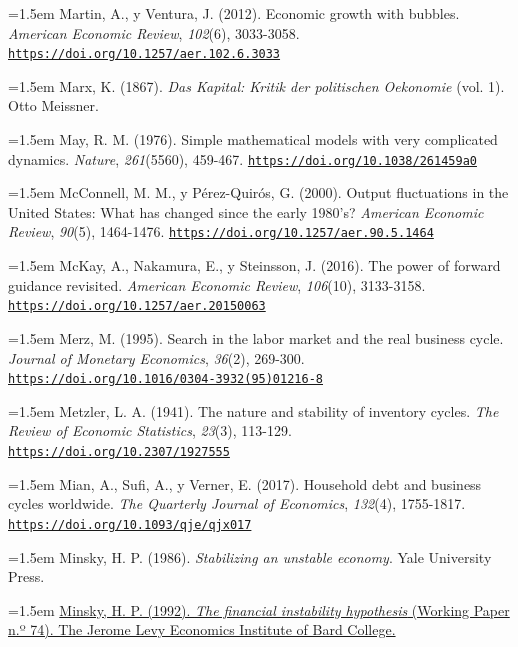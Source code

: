 \documentclass[10pt,a4paper]{article}
\begin{document}
\noindent\hangindent=1.5em Martin, A., y Ventura, J. (2012). Economic growth with bubbles. \textit{American Economic Review}, \textit{102}(6), 3033-3058. \href{https://doi.org/10.1257/aer.102.6.3033}{\nolinkurl{https://doi.org/10.1257/aer.102.6.3033}}

\noindent\hangindent=1.5em Marx, K. (1867). \textit{Das Kapital: Kritik der politischen Oekonomie} (vol. 1). Otto Meissner.

\noindent\hangindent=1.5em May, R. M. (1976). Simple mathematical models with very complicated dynamics. \textit{Nature}, \textit{261}(5560), 459-467. \href{https://doi.org/10.1038/261459a0}{\nolinkurl{https://doi.org/10.1038/261459a0}}

\noindent\hangindent=1.5em McConnell, M. M., y Pérez-Quirós, G. (2000). Output fluctuations in the United States: What has changed since the early 1980's? \textit{American Economic Review}, \textit{90}(5), 1464-1476. \href{https://doi.org/10.1257/aer.90.5.1464}{\nolinkurl{https://doi.org/10.1257/aer.90.5.1464}}

\noindent\hangindent=1.5em McKay, A., Nakamura, E., y Steinsson, J. (2016). The power of forward guidance revisited. \textit{American Economic Review}, \textit{106}(10), 3133-3158. \href{https://doi.org/10.1257/aer.20150063}{\nolinkurl{https://doi.org/10.1257/aer.20150063}}

\noindent\hangindent=1.5em Merz, M. (1995). Search in the labor market and the real business cycle. \textit{Journal of Monetary Economics}, \textit{36}(2), 269-300. \href{https://doi.org/10.1016/0304-3932(95)01216-8}{\nolinkurl{https://doi.org/10.1016/0304-3932(95)01216-8}}

\noindent\hangindent=1.5em Metzler, L. A. (1941). The nature and stability of inventory cycles. \textit{The Review of Economic Statistics}, \textit{23}(3), 113-129. \href{https://doi.org/10.2307/1927555}{\nolinkurl{https://doi.org/10.2307/1927555}}

\noindent\hangindent=1.5em Mian, A., Sufi, A., y Verner, E. (2017). Household debt and business cycles worldwide. \textit{The Quarterly Journal of Economics}, \textit{132}(4), 1755-1817. \href{https://doi.org/10.1093/qje/qjx017}{\nolinkurl{https://doi.org/10.1093/qje/qjx017}}

\noindent\hangindent=1.5em Minsky, H. P. (1986). \textit{Stabilizing an unstable economy}. Yale University Press.

\noindent\hangindent=1.5em \href{https://ideas.repec.org/p/lev/wrkpap/wp_74.html}{Minsky, H. P. (1992). \textit{The financial instability hypothesis} (Working Paper n.º 74). The Jerome Levy Economics Institute of Bard College.}
\end{document}
